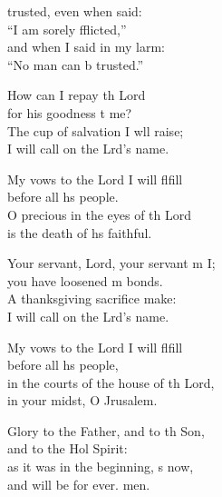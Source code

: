 \settowidth{\versewidth}{in the courts of the house of the Lord,  *}
\begin{psalmverse}%
  \begin{patverse}
     trusted, even when  said: \Med\\
    “I am sorely fflicted,”\\
    and when I said in my larm: \Med\\
    “No man can b trusted.”
    
    How can I repay th Lord \Med\\
    for his goodness t me?\\
    The cup of salvation I w\pointup{\i}ll raise; \Med\\
    I will call on the Lrd’s name.
    
    My vows to the Lord I will flfill \Med\\
    before all h\pointup{\i}s people.\\
    O precious in the eyes of th Lord \Med\\
    is the death of h\pointup{\i}s faithful.

    Your servant, Lord, your servant m I; \Med\\
    you have loosened m bonds.\\
    A thanksgiving sacrifice  make: \Med\\
    I will call on the Lrd’s name.

    My vows to the Lord I will flfill \Med\\
    before all h\pointup{\i}s people,\\
    in the courts of the house of th Lord, \Med\\
    in your midst, O Jrusalem.

    Glory to the Father, and to th Son, \Med\\
    and to the Hol Spirit:\\
    as it was in the beginning, \pointup{\i}s now, \Med\\
    and will be for ever. men.
  \end{patverse}
\end{psalmverse}
